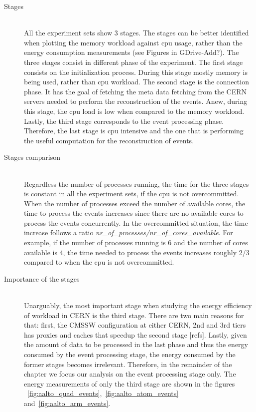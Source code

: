 \begin{description}
\item[Stages] \hfill \\
All the experiment sets show 3 stages. The stages can be better identified 
when plotting
the memory workload against cpu usage, rather than the energy consumption 
measurements (see Figures in GDrive-Add?). The three stages consist in different 
phase of the
experiment. The first stage consists on the initialization process. During this
stage mostly memory is being used, rather than cpu workload. The second stage
is the connection phase. It has the goal of fetching the  meta data fetching from
the CERN servers needed to perform the reconstruction of the events. Anew, 
during this stage, the cpu load is low when compared to the 
memory workload. Lastly, the third stage corresponds to the event processing
phase. Therefore, the last stage is cpu intensive and the one that is performing 
the useful computation for the reconstruction of events.

\item[Stages comparison] \hfill \\
Regardless the number of processes running, the time for the three stages is 
constant in all the experiment sets, if the cpu is not overcommitted. When
the number of processes exceed the number of available cores, the time to 
process the events increases since there are no available cores to process the
events concurrently. In the overcommitted situation, the time increase follows
a ratio \textit{nr\_of\_processes/nr\_of\_cores\_available}. For example, if the
number of processes running is 6 and the number of cores available is 4, the
time needed to process the events increases roughly 2/3 compared to when the
cpu is not overcommitted.   


\item[Importance of the stages] \hfill \\
Unarguably, the most important stage when studying the energy efficiency of
workload in CERN is the third stage. There are two main reasons for that: first,
 the CMSSW configuration at either CERN, 2nd and 3rd tiers has proxies
and caches that speedup the second stage [refs]. Lastly, given the amount of
data to be processed in the last phase and thus the energy consumed by the
event processing stage, the energy consumed by the former stages becomes
 irrelevant. Therefore, in the remainder of the chapter we focus our analysis on 
 the event processing stage only. The energy measurements of only the third stage
 are shown in the figures
~\ref{fig:aalto_quad_events},~\ref{fig:aalto_atom_events} and~\ref{fig:aalto_arm_events}. 



\end{description}
